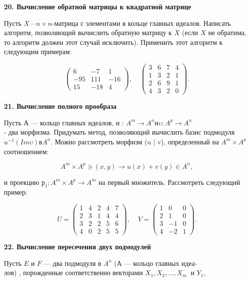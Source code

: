 \documentclass{../template/mai_book}
\begin{document}
{\noindent\bf20. Вычисление обратной матрицы к квадратной матрице} 


Пусть $X — n \times n$-матрица с элементами в кольце главных идеалов. 
Написать алгоритм, позволяющий вычислить обратную матрицу к $X$ 
(если $X$ не обратима, то алгоритм должен этот случай исключить). 
Применить этот алгоритм к следующим примерам: 


$$\begin{pmatrix}
6 & -7 & 1 \\
-95 & 111 & -16 \\
15 & -18 & 4 
\end{pmatrix},\;\;\;\;
\begin{pmatrix}
3 & 6 & 7 & 4 \\
1 & 3 & 2 & 1\\
2 & 6 & 9 & 1\\
4 & 3 & 2 & 0
\end{pmatrix}.$$


{\noindent\bf21. Вычисление полного прообраза}


Пусть А — кольцо главных идеалов, и : $A^m \longrightarrow A^n \text{и} \upsilon : A^p \longrightarrow A^n 
$\\- два морфизма. Придумать метод, позволяющий вычислить базис 
подмодуля $u^{-1}(Im \upsilon) \text{в} A^n$. Можно рассмотреть морфизм (u | v), 
определенный на $A^m \times A^p$ соотношением:


$$ A^m \times A^p \ni (x,y)\to u(x) + v(y)\in A^n, $$


и проекцию $ р_1 : A^m \times A^p \rightarrow A^m $ на первый множитель. Рассмотреть 
следующий пример: 


$$U=\begin{pmatrix}
1 & 4 & 2 & 4 & 7 \\
2 & 3 & 1 & 4 & 4\\
3 & 2 & 2 & 5 & 6\\
4 & 0 & 2 & 5 & 5
\end{pmatrix},\;\;\;\;
V=\begin{pmatrix}
1 & 0 & 0  \\
2 & 1 & 0 \\
3 & -1 & 0 \\
4 & -2 & 1 
\end{pmatrix}.$$ 


{\noindent\bf22. Вычисление пересечения двух подмодулей }


Пусть $E$ и $F$ — два подмодуля в $A^n$ ($А$ — кольцо главных 
идеа-\\лов) , порожденные соответственно векторами $ X_1,X_2,...,X_m\;\;\text{и }Y_1 $,
\end{document}
